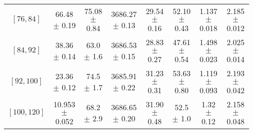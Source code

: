 \begin{tabular}{c||c|c|c|c|c|c|c}
$[76, 84]$ & 66.48 $\pm$ 0.19 & 75.08 $\pm$ 0.84 & 3686.27 $\pm$ 0.13 & 29.54 $\pm$ 0.16 & 52.10 $\pm$ 0.43 & 1.137 $\pm$ 0.018 & 2.185 $\pm$ 0.012\\
$[84, 92]$ & 38.36 $\pm$ 0.14 & 63.0 $\pm$ 1.6 & 3686.53 $\pm$ 0.15 & 28.83 $\pm$ 0.27 & 47.61 $\pm$ 0.54 & 1.498 $\pm$ 0.023 & 2.025 $\pm$ 0.014\\
$[92, 100]$ & 23.36 $\pm$ 0.12 & 74.5 $\pm$ 1.7 & 3685.91 $\pm$ 0.22 & 31.23 $\pm$ 0.31 & 53.63 $\pm$ 0.80 & 1.119 $\pm$ 0.093 & 2.193 $\pm$ 0.042\\
$[100, 120]$ & 10.953 $\pm$ 0.052 & 68.2 $\pm$ 2.9 & 3686.65 $\pm$ 0.20 & 31.90 $\pm$ 0.48 & 52.5 $\pm$ 1.0 & 1.32 $\pm$ 0.12 & 2.158 $\pm$ 0.048\\
\end{tabular}
